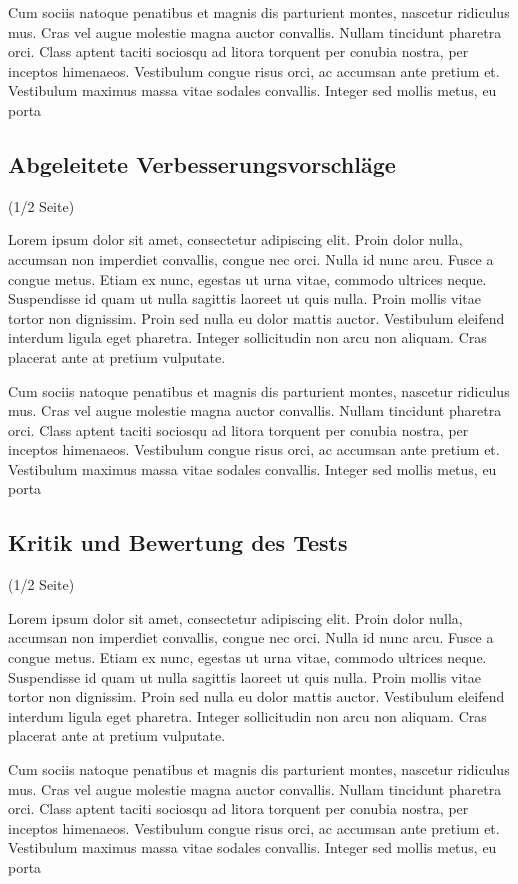 Cum sociis natoque penatibus et magnis dis parturient montes, nascetur ridiculus mus. Cras vel augue molestie magna auctor convallis. Nullam tincidunt pharetra orci. Class aptent taciti sociosqu ad litora torquent per conubia nostra, per inceptos himenaeos. Vestibulum congue risus orci, ac accumsan ante pretium et. Vestibulum maximus massa vitae sodales convallis. Integer sed mollis metus, eu porta

\subsection{Abgeleitete Verbesserungsvorschläge}
\label{sec:verbesserungsvorschlaege}

(1/2 Seite)

Lorem ipsum dolor sit amet, consectetur adipiscing elit. Proin dolor nulla, accumsan non imperdiet convallis, congue nec orci. Nulla id nunc arcu. Fusce a congue metus. Etiam ex nunc, egestas ut urna vitae, commodo ultrices neque. Suspendisse id quam ut nulla sagittis laoreet ut quis nulla. Proin mollis vitae tortor non dignissim. Proin sed nulla eu dolor mattis auctor. Vestibulum eleifend interdum ligula eget pharetra. Integer sollicitudin non arcu non aliquam. Cras placerat ante at pretium vulputate.

Cum sociis natoque penatibus et magnis dis parturient montes, nascetur ridiculus mus. Cras vel augue molestie magna auctor convallis. Nullam tincidunt pharetra orci. Class aptent taciti sociosqu ad litora torquent per conubia nostra, per inceptos himenaeos. Vestibulum congue risus orci, ac accumsan ante pretium et. Vestibulum maximus massa vitae sodales convallis. Integer sed mollis metus, eu porta

\subsection{Kritik und Bewertung des Tests}
\label{sec:kritik}

(1/2 Seite)

Lorem ipsum dolor sit amet, consectetur adipiscing elit. Proin dolor nulla, accumsan non imperdiet convallis, congue nec orci. Nulla id nunc arcu. Fusce a congue metus. Etiam ex nunc, egestas ut urna vitae, commodo ultrices neque. Suspendisse id quam ut nulla sagittis laoreet ut quis nulla. Proin mollis vitae tortor non dignissim. Proin sed nulla eu dolor mattis auctor. Vestibulum eleifend interdum ligula eget pharetra. Integer sollicitudin non arcu non aliquam. Cras placerat ante at pretium vulputate.

Cum sociis natoque penatibus et magnis dis parturient montes, nascetur ridiculus mus. Cras vel augue molestie magna auctor convallis. Nullam tincidunt pharetra orci. Class aptent taciti sociosqu ad litora torquent per conubia nostra, per inceptos himenaeos. Vestibulum congue risus orci, ac accumsan ante pretium et. Vestibulum maximus massa vitae sodales convallis. Integer sed mollis metus, eu porta

\clearpage